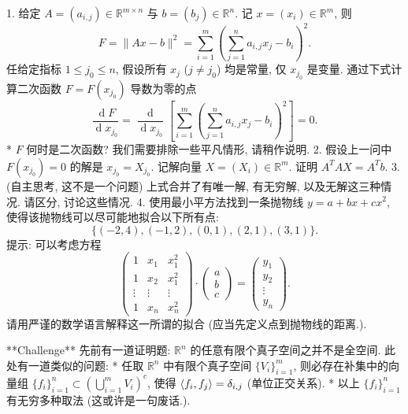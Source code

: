 \documentclass[11pt]{ctexart}
\theoremstyle{definition}
\numberwithin{equation}{section}
\theoremstyle{definition}
\theoremstyle{remark}
\begin{document}
1. 给定 $A=(a_{i,j})\in \mathbb R^{m\times n}$ 与 $b=(b_j)\in \mathbb R^{n}$. 记 $x=(x_i)\in \mathbb R^m$, 则
    $$
    F=\|Ax-b\|^2=\sum_{i=1}^m\left(\sum_{j=1}^na_{i,j}x_j-b_i\right)^2.
    $$
    任给定指标 $1\leq j_0\leq n$, 假设所有 $x_j$ ($j\neq j_0$) 均是常量, 仅 $x_{j_0}$ 是变量. 通过下式计算二次函数 $F=F(x_{j_0})$ 导数为零的点
    $$
    \frac{\operatorname d F}{\operatorname d x_{j_0}} =\frac{\operatorname d }{\operatorname d x_{j_0}}\left[\sum_{i=1}^m\left(\sum_{j=1}^na_{i,j}x_j-b_i\right)^2\right] =0.
    $$
    * $F$ 何时是二次函数? 我们需要排除一些平凡情形, 请稍作说明.
2. 假设上一问中 $F(x_{j_0})=0$ 的解是 $x_{j_0}=X_{j_0}$. 记解向量 $X=(X_i)\in \mathbb R^m$. 证明 $A^TAX=A^Tb$.
3. (自主思考, 这不是一个问题) 上式合并了有唯一解, 有无穷解, 以及无解这三种情况. 请区分, 讨论这些情况.
4. 使用最小平方法找到一条抛物线 $y=a+bx+cx^2$, 使得该抛物线可以尽可能地拟合以下所有点:
    $$
    \{(-2,4),(-1,2),(0,1),(2,1),(3,1)\}.
    $$
    提示: 可以考虑方程
    $$
    \begin{pmatrix}1&x_1&x_1^2\\1&x_2&x_1^2\\\vdots &\vdots& \vdots \\1&x_n&x_n^2\end{pmatrix}\cdot \begin{pmatrix}a\\ b\\ c\end{pmatrix} =\begin{pmatrix}y_1\\ y_2\\ \vdots \\ y_n\end{pmatrix}.
    $$
    请用严谨的数学语言解释这一所谓的拟合 (应当先定义点到抛物线的距离.).



**Challenge** 先前有一道证明题: $\mathbb R^n$ 的任意有限个真子空间之并不是全空间. 此处有一道类似的问题:
* 任取 $\mathbb R^n$ 中有限个真子空间 $\{V_i\}_{i=1}^m$, 则必存在补集中的向量组 $\{f_i\}_{i=1}^n\subset \left(\bigcup_{i=1}^m V_i\right)^c$, 使得 $\braket{f_i,f_j}=\delta_{i,j}$ (单位正交关系).
* 以上 $\{f_i\}_{i=1}^n$ 有无穷多种取法 (这或许是一句废话.).
\end{document}
